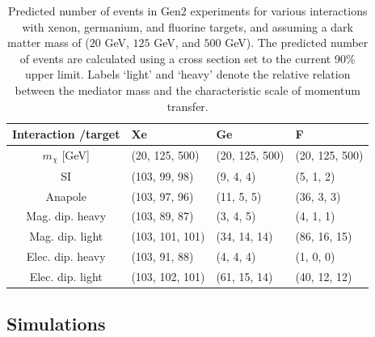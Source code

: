 \documentclass[11pt]{article}
\begin{document}
\begin{table}[t] 
\setlength{\extrarowheight}{3pt}
\setlength{\tabcolsep}{12pt}
\begin{center}
\begin{tabular}{c||m{3cm}|m{3cm}|m{3cm}}
Interaction /target & Xe & Ge & F\\
\hline\hline 
$m_\chi$ [GeV] & (20, 125, 500) & (20, 125, 500) & (20, 125, 500) \\
\hline\hline 
SI& (103, 99, 98) & (9, 4, 4)& (5, 1, 2)\\ \hline
Anapole& (103, 97, 96)& (11, 5, 5)& (36, 3, 3)\\ \hline
Mag. dip. heavy& (103, 89, 87)& (3, 4, 5)& (4, 1, 1)\\ \hline
Mag. dip. light& (103, 101, 101)& (34, 14, 14)& (86, 16, 15)\\ \hline
Elec. dip. heavy& (103, 91, 88)& (4, 4, 4)& (1, 0, 0)\\ \hline
Elec. dip. light& (103, 102, 101)& (61, 15, 14)& (40, 12, 12)\\ \hline \hline
\end{tabular}
\end{center}
\caption{Predicted number of events in Gen2 experiments for various interactions with xenon, germanium, and fluorine targets, and assuming a dark matter mass of ($20$ GeV, $125$ GeV, and $500$ GeV). The predicted number of events are calculated using a cross section set to the current 90\% upper limit. Labels `light' and `heavy' denote the relative relation between the mediator mass and the characteristic scale of momentum transfer. }
\label{tab:pred_events}
\end{table}


\subsection{Simulations\label{sec:sims}}
\end{document}
